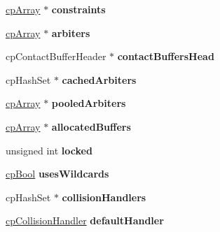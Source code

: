 \begin{DoxyCompactItemize}
\item 
\mbox{\label{structcp_space_ae22a0f11a7957a5a23acc287a265246c}} 
\mbox{\hyperlink{structcp_array}{cp\+Array}} $\ast$ {\bfseries constraints}
\item 
\mbox{\label{structcp_space_adaef45459e5d96f9006a2d19a383fd28}} 
\mbox{\hyperlink{structcp_array}{cp\+Array}} $\ast$ {\bfseries arbiters}
\item 
\mbox{\label{structcp_space_a985b08764b2aa665110b81cc4b53c4d7}} 
cp\+Contact\+Buffer\+Header $\ast$ {\bfseries contact\+Buffers\+Head}
\item 
\mbox{\label{structcp_space_a99818a31e7e3b840e1e7eed93ed7051f}} 
cp\+Hash\+Set $\ast$ {\bfseries cached\+Arbiters}
\item 
\mbox{\label{structcp_space_ad4b497d160bf4c400e8504b53f494591}} 
\mbox{\hyperlink{structcp_array}{cp\+Array}} $\ast$ {\bfseries pooled\+Arbiters}
\item 
\mbox{\label{structcp_space_a04092f5b2f4b06263d09919ec0ba28c9}} 
\mbox{\hyperlink{structcp_array}{cp\+Array}} $\ast$ {\bfseries allocated\+Buffers}
\item 
\mbox{\label{structcp_space_aad32581cd9bac9f485e4910e8a2256e9}} 
unsigned int {\bfseries locked}
\item 
\mbox{\label{structcp_space_af91f836d9c1614ea43ba9ac507535be9}} 
\mbox{\hyperlink{group__basic_types_gabc5e752c48f3449ca26ef413ecbd647e}{cp\+Bool}} {\bfseries uses\+Wildcards}
\item 
\mbox{\label{structcp_space_a4466f8814bfb39de60734d435649b0dd}} 
cp\+Hash\+Set $\ast$ {\bfseries collision\+Handlers}
\item 
\mbox{\label{structcp_space_a6c58059b9576001c8a18c11fb9b231c4}} 
\mbox{\hyperlink{structcp_collision_handler}{cp\+Collision\+Handler}} {\bfseries default\+Handler}
\item 
\mbox{\label{structcp_space_a4b82b21459a5bee3aaef8df4c3f131fd}} 

\end{DoxyCompactItemize}
